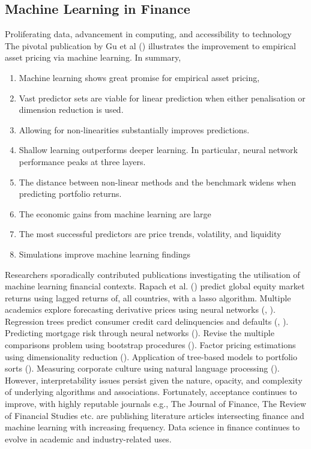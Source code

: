 \documentclass[12pt]{article}
\begin{document}
\subsection{Machine Learning in Finance}
Proliferating data, advancement in computing, and accessibility to technology
The pivotal publication by Gu et al (\citeyear{eapvml}) illustrates the improvement to empirical asset pricing via machine learning.
In summary,
\begin{enumerate}
	\item Machine learning shows great promise for empirical asset pricing,
	\item Vast predictor sets are viable for linear prediction when either penalisation or dimension reduction is used.
	\item Allowing for non-linearities substantially improves predictions.
	\item Shallow learning outperforms deeper learning. In particular, neural network performance peaks at three layers.
	\item The distance between non-linear methods and the benchmark widens when predicting portfolio returns.
	\item The economic gains from machine learning are large
	\item The most successful predictors are price trends, volatility, and liquidity
	\item Simulations improve machine learning findings
\end{enumerate}
Researchers sporadically contributed publications investigating the utilisation of machine learning financial contexts.
Rapach et al. (\citeyear{rapach2013international}) predict global equity market returns using lagged returns of, all countries, with a lasso algorithm.
Multiple academics explore forecasting derivative prices using neural networks (\cite{fleck1994strain}, \cite{cai2000functional}).
Regression trees predict consumer credit card delinquencies and defaults (\cite{khandani2010consumer}, \cite{butaru2016risk}).
Predicting mortgage risk through neural networks (\cite{sirignano2016deep}).
Revise the multiple comparisons problem using bootstrap procedures (\cite{harvey2016and}).
Factor pricing estimations using dimensionality reduction (\cite{feng2020taming}).
Application of tree-based models to portfolio sorts (\cite{moritz2016tree}).
Measuring corporate culture using natural language processing (\cite{corporate-culture}).
However, interpretability issues persist given the nature, opacity, and complexity of underlying algorithms and associations.
Fortunately, acceptance continues to improve, with highly reputable journals e.g.,
The Journal of Finance, The Review of Financial Studies etc. are publishing literature articles intersecting finance and machine learning with increasing frequency.
Data science in finance continues to evolve in academic and industry-related uses.
\end{document}
